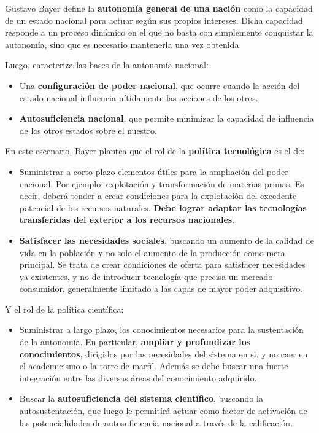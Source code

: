 Gustavo Bayer define la \textbf{autonomía general de una nación}  como la capacidad
de un estado nacional para actuar según sus propios intereses. Dicha capacidad
responde a un proceso dinámico en el que no basta con simplemente conquistar la autonomía,
sino que es necesario mantenerla una vez obtenida.

Luego, caracteriza las bases de la autonomía nacional:
\begin{itemize}
    \item Una \textbf{configuración de poder nacional}, que ocurre cuando la acción del estado nacional
        influencia nítidamente las acciones de los otros.
    \item \textbf{Autosuficiencia nacional}, que permite minimizar la capacidad de influencia
        de los otros estados sobre el nuestro.
\end{itemize}

En este escenario, Bayer plantea que el rol de la \textbf{política tecnológica} es el de:
\begin{itemize}
    \item Suministrar a corto plazo elementos útiles para la ampliación del poder nacional.
        Por ejemplo: explotación y transformación de materias primas. Es decir,
        deberá tender a crear condiciones para la explotación del excedente potencial de los recursos
        naturales. \textbf{Debe lograr adaptar las tecnologías transferidas del exterior a los
        recursos nacionales}.
    \item \textbf{Satisfacer las necesidades sociales}, buscando un aumento de la calidad de vida
        en la población y no solo el aumento de la producción como meta principal.
        Se trata de crear condiciones de oferta para satisfacer necesidades ya existentes,
        y no de introducir tecnología que precisa un mercado consumidor,
        generalmente limitado a las capas de mayor poder adquisitivo.
\end{itemize}

Y el rol de la política científica:
\begin{itemize}
    \item Suministrar a largo plazo, los conocimientos necesarios para la sustentación de la autonomía. En particular, \textbf{ampliar y profundizar los conocimientos}, dirigidos por las necesidades del sistema en si, y no caer en el academicismo o la torre de marfil.
        Además se debe buscar una fuerte integración entre las diversas áreas del conocimiento adquirido.
    \item Buscar la \textbf{autosuficiencia del sistema científico}, buscando la autosustentación, que luego le permitirá actuar como factor de activación de las potencialidades de autosuficiencia nacional a través de la calificación.
\end{itemize}

